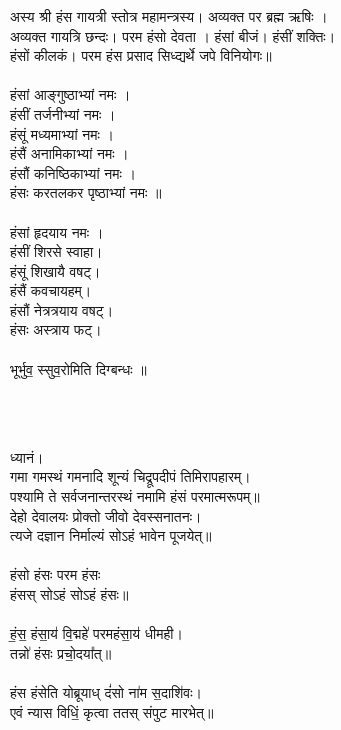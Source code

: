 \subsection{}
\\
अस्य श्री हंस गायत्री स्तोत्र महामन्त्रस्य। अव्यक्त पर ब्रह्म ऋषिः ।\\
अव्यक्त गायत्रि छन्दः। परम हंसो देवता । हंसां बीजं। हंसीं शक्तिः।\\
 हंसों कीलकं। परम हंस प्रसाद सिध्द्यर्थे जपे विनियोगः॥\\
\\
हंसां आङ्गुष्ठाभ्यां नमः ।\\
हंसीं तर्जनीभ्यां नमः ।\\
हंसूं मध्यमाभ्यां नमः ।\\
हंसैं अनामिकाभ्यां नमः ।\\
हंसौं कनिष्ठिकाभ्यां नमः ।\\
हंसः करतलकर पृष्ठाभ्यां नमः ॥\\
\\
हंसां हृदयाय नमः ।\\
हंसीं शिरसे स्वाहा।\\
हंसूं शिखायै वषट्।\\
हंसैं कवचायहम्।\\
हंसौं नेत्रत्रयाय वषट्।\\
हंसः अस्त्राय फट्।\\
\\
भूर्भुव॒ स्सुव॒रोमिति दिग्बन्धः ॥\\
\\
\subsection{}
\\
ध्यानं।\\
गमा गमस्थं गमनादि शून्यं चिद्रूपदीपं तिमिरापहारम्।\\
पश्यामि ते सर्वजनान्तरस्थं नमामि हंसं परमात्मरूपम्॥\\
देहो देवालयः प्रोक्तो जीवो देवस्सनातनः।\\
त्यजे दज्ञान निर्माल्यं सोऽहं भावेन पूजयेत्॥\\
\\
हंसो हंसः परम हंसः  \\
हंसस् सोऽहं सोऽहं हंसः॥\\
\\
हं॒स॒ हंसा॒य॑ वि॒द्महे॑ परमहंसा॒य॑ धीमही।\\
तन्नो॑ हंसः प्रचो॒दया᳚त्॥\\
\\
हंस हंसेति योब्रूयाध् दं॑सो ना॑म स॒दाशि॑वः।\\
एवं न्यास विधिं॒ कृत्वा ततस् संपुट मारभेत्॥\\
